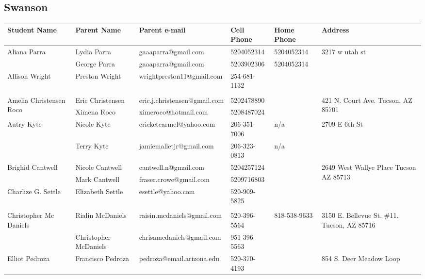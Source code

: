 \documentclass[landscape]{article}\usepackage[]{graphicx}\usepackage[]{color}
\begin{document}
\subsection{Swanson}
\begin{longtable}{|p{100pt}|p{100pt}|p{140pt}|p{60pt}|p{64pt}|p{120pt}|}
\textbf{Student Name} & \textbf{Parent Name} & \textbf{Parent e-mail} & \textbf{Cell Phone} & \textbf{Home Phone} & \textbf{Address}\\
\hline
\hline
\multirow{2}{100pt}{Aliana Parra} & Lydia Parra & gaaaparra@gmail.com & 5204052314 & 5204052314 & \multirow{2}{120pt}{3217 w utah st} \\
 & George Parra & gaaaparra@gmail.com & 5203902306 & 5204052314 & \\
\hline
\multirow{2}{100pt}{Allison Wright} & Preston Wright & wrightpreston11@gmail.com & 254-681-1132 &  & \multirow{2}{120pt}{} \\
 &  &  &  &  & \\
\hline
\multirow{2}{100pt}{Amelia Christensen Roco} & Eric Christensen & eric.j.christensen@gmail.com & 5202478890 &  & \multirow{2}{120pt}{421 N. Court Ave. Tucson, AZ 85701} \\
 & Ximena Roco & ximeroco@hotmail.com & 5208487024 &  & \\
\hline
\multirow{2}{100pt}{Autry Kyte} & Nicole Kyte & cricketcarmel@yahoo.com & 206-351-7006 & n/a & \multirow{2}{120pt}{2709 E 6th St} \\
 & Terry Kyte & jamiemalletjr@gmail.com & 206-323-0813 & n/a & \\
\hline
\multirow{2}{100pt}{Brighid Cantwell} & Nicole Cantwell & cantwell.n@gmail.com & 5204257124 &  & \multirow{2}{120pt}{2649 West Wallye Place Tucson AZ 85713} \\
 & Mark Cantwell & fraser.crowe@gmail.com & 5209716803 &  & \\
\hline
\multirow{2}{100pt}{Charlize G. Settle} & Elizabeth Settle & esettle@yahoo.com & 520-909-5825 &  & \multirow{2}{120pt}{} \\
 &  &  &  &  & \\
\hline
\multirow{2}{100pt}{Christopher Mc Daniels} & Rialin McDaniels & raisin.mcdaniels@gmail.com & 520-396-5564 & 818-538-9633 & \multirow{2}{120pt}{3150 E. Bellevue St. \#11. Tucson, AZ 85716} \\
 & Christopher McDaniels & chrisamcdaniels@gmail.com & 951-396-5563 &  & \\
\hline
\multirow{2}{100pt}{Elliot Pedroza} & Francisco Pedroza & pedroza@email.arizona.edu & 520-370-4193 &  & \multirow{2}{120pt}{854 S. Deer Meadow Loop} \\

\end{longtable}
\end{document}
